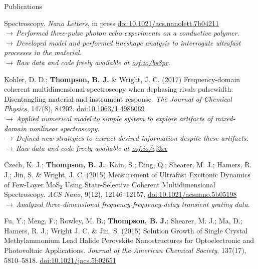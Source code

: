\documentclass{resume}  %
\begin{document}
\begin{rSection}{Publications}
\begin{etaremune}[leftmargin = 1.75em]
      Spectroscopy.
      \textit{Nano Letters}, in press
      \href{https://doi.org/10.1021/acs.nanolett.7b04211}{doi:10.1021/acs.nanolett.7b04211} \\
      $\rightarrow\,$\textit{Performed three-pulse photon echo experiments on a conductive
        polymer.} \\
      $\rightarrow\,$\textit{Developed model and performed lineshape analysis to interrogate
        ultrafast processes in the material.} \\
      $\rightarrow\,$\textit{Raw data and code freely available at
        \href{https://osf.io/bs8pr/}{osf.io/bs8pr}.}
    \item Kohler, D. D.; \textbf{Thompson, B. J.} \& Wright, J. C.
      (2017)
      Frequency-domain coherent multidimensional spectroscopy when dephasing rivals pulsewidth:
      Disentangling material and instrument response.
      \textit{The Journal of Chemical Physics}, 147(8), 84202.
      \href{https://doi.org/10.1063/1.4986069}{doi:10.1063/1.4986069} \\
      $\rightarrow\,$\textit{Applied numerical model to simple system to explore artifacts of
        mixed-domain nonlinear spectroscopy.} \\
      $\rightarrow\,$\textit{Defined new strategies to extract desired information despite these
        artifacts.} \\
      $\rightarrow\,$\textit{Raw data and code freely available at
        \href{https://osf.io/ej2xe/}{osf.io/ej2xe}}
    \item Czech, K. J.; \textbf{Thompson, B. J.}; Kain, S.; Ding, Q.; Shearer, M. J.; Hamers,
      R. J.; Jin, S. \& Wright, J. C.
      (2015)
      Measurement of Ultrafast Excitonic Dynamics of Few-Layer MoS$_2$ Using State-Selective
      Coherent Multidimensional Spectroscopy.
      \textit{ACS Nano}, 9(12), 12146–12157.
      \href{https://doi.org/10.1021/acsnano.5b05198}{doi:10.1021/acsnano.5b05198} \\
      $\rightarrow\,$\textit{Analyzed three-dimensional frequency-frequency-delay transient grating
        data.}
    \item Fu, Y.; Meng, F.; Rowley, M. B.; \textbf{Thompson, B. J.}; Shearer, M. J.;
      Ma, D.; Hamers, R. J.; Wright J. C. \& Jin, S.
      (2015)
      Solution Growth of Single Crystal Methylammonium Lead Halide Perovskite Nanostructures for
      Optoelectronic and Photovoltaic Applications.
      \textit{Journal of the American Chemical Society}, 137(17), 5810–5818.
      \href{https://doi.org/10.1021/jacs.5b02651}{doi:10.1021/jacs.5b02651} \\

\end{etaremune}
\end{rSection}
\end{document}
